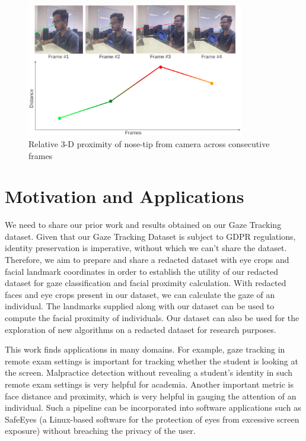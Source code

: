 \begin{figure}[h]
  \centering
    \includegraphics[width=0.85\textwidth]{Introduction/RelFaceDist}
    \caption[Relative Face Proximity]{Relative 3-D proximity of nose-tip from camera across consecutive frames}
    \label{fig:relFaceDist} 
\end{figure}


\section{Motivation and Applications}
We need to share our prior work and results obtained on our Gaze Tracking dataset. Given that our Gaze Tracking Dataset is subject to GDPR regulations, identity preservation is imperative, without which we can’t share the dataset. Therefore, we aim to prepare and share a redacted dataset with eye crops and facial landmark coordinates in order to establish the utility of our redacted dataset for gaze classification and facial proximity calculation. With redacted faces and eye crops present in our dataset, we can calculate the gaze of an individual. The landmarks supplied along with our dataset can be used to compute the facial proximity of individuals. Our dataset can also be used for the exploration of new algorithms on a redacted dataset for research purposes.

This work finds applications in many domains. For example, gaze tracking in remote exam settings is important for tracking whether the student is looking at the screen. Malpractice detection without revealing a student’s identity in such remote exam settings is very helpful for academia. Another important metric is face distance and proximity, which is very helpful in gauging the attention of an individual. Such a pipeline can be incorporated into software applications such as SafeEyes (a Linux-based software for the protection of eyes from excessive screen exposure) without breaching the privacy of the user.

